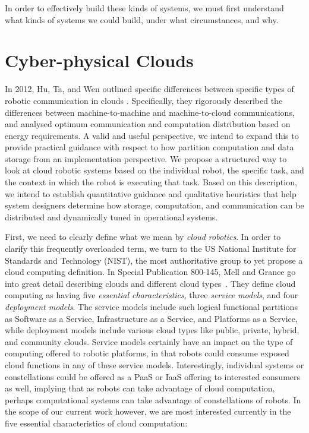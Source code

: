 \documentclass{sig-alternate}
\begin{document}
In order to effectively build these kinds of systems, we must first understand what kinds of systems we could build, under what circumstances, and why.  

\section{Cyber-physical Clouds}
In 2012, Hu, Ta, and Wen outlined specific differences between specific types of robotic communication in clouds \cite{HuTaWe:12}.  Specifically, they rigorously described the differences between machine-to-machine and machine-to-cloud communications, and analysed optimum communication and computation distribution based on energy requirements.  A valid and useful perspective, we intend to expand this to provide practical guidance with respect to how partition computation and data storage from an implementation perspective.  We propose a structured way to look at cloud robotic systems based on the individual robot, the specific task, and the context in which the robot is executing that task.  Based on this description, we intend to establish quantitative guidance and qualitative heuristics that help system designers determine how storage, computation, and communication can be distributed and dynamically tuned in operational systems.

First, we need to clearly define what we mean by {\sl cloud robotics}.  In order to clarify this frequently overloaded term, we turn to the US National Institute for Standards and Technology (NIST), the most authoritative group to yet propose a cloud computing definition.  In Special Publication 800-145, Mell and Grance go into great detail describing clouds and different cloud types~\cite{NIST-SP-800-145}. They define cloud computing as having five {\sl essential characteristics}, three {\sl service models}, and four {\sl deployment models}.  The service models include such logical functional partitions as Software as a Service, Infrastructure as a Service, and Platforms as a Service, while deployment models include various cloud types like public, private, hybrid, and community clouds.  Service models certainly have an impact on the type of computing offered to robotic platforms, in that robots could consume exposed cloud functions in any of these service models.  Interestingly, individual systems or constellations could be offered as a PaaS or IaaS offering to interested consumers as well, implying that as robots can take advantage of cloud computation, perhaps computational systems can take advantage of constellations of robots.  In the scope of our current work however, we are most interested currently in the five essential characteristics of cloud computation:
\end{document}
